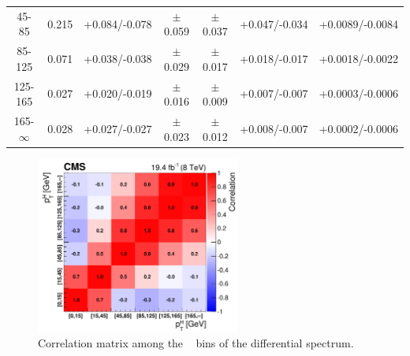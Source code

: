 \begin{table}
{\begin{tabular}{ccccccc}
45-85 & 0.215 & +0.084/-0.078 & $\pm$0.059 & $\pm$0.037 & +0.047/-0.034  & +0.0089/-0.0084 \\ 
85-125 & 0.071 & +0.038/-0.038 & $\pm$0.029 & $\pm$0.017 & +0.018/-0.017  & +0.0018/-0.0022 \\ 
125-165 & 0.027 & +0.020/-0.019 & $\pm$0.016 & $\pm$0.009 & +0.007/-0.007  & +0.0003/-0.0006 \\ 
165-$\infty$ & 0.028 & +0.027/-0.027 & $\pm$0.023 & $\pm$0.012 & +0.008/-0.007  & +0.0002/-0.0006 \\ 
\bottomrule 
\end{tabular}
}
\end{table}

\begin{figure}[!h]
\centering
\includegraphics[width=0.6\textwidth]{images/unblinding/covMatrix.pdf}
\caption{Correlation matrix among the \pth~ bins of the differential spectrum.}\label{fig:cov_matrix}
\end{figure}

